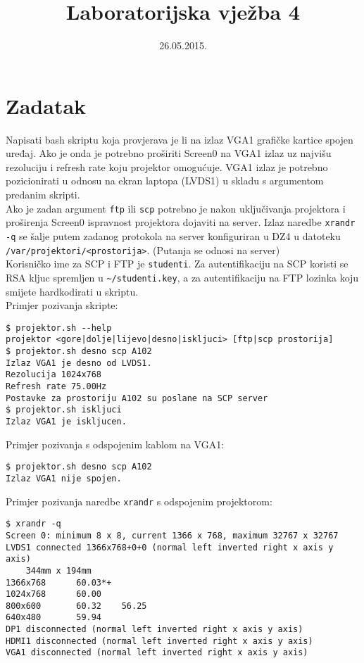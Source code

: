 \documentclass[12pt,a4paper]{article}
\begin{document}
	\title{Laboratorijska vježba 4}
	\date{\vspace{-5ex} 26.05.2015.}
	\maketitle

\section*{Zadatak}

Napisati bash skriptu koja provjerava je li na izlaz VGA1 grafičke kartice spojen uređaj. Ako je onda je potrebno proširiti Screen0 na VGA1 izlaz uz najvišu rezoluciju i refresh rate koju projektor omogućuje. VGA1 izlaz je potrebno pozicionirati u odnosu na ekran laptopa (LVDS1) u skladu s argumentom predanim skripti.\\

Ako je zadan argument \texttt{ftp} ili \texttt{scp} potrebno je nakon uključivanja projektora i proširenja Screen0 ispravnost projektora dojaviti na server. Izlaz naredbe \texttt{xrandr -q} se šalje putem zadanog protokola na server konfiguriran u DZ4 u datoteku \texttt{/var/projektori/<prostorija>}. (Putanja se odnosi na server)\\

Korisničko ime za SCP i FTP je \texttt{studenti}. Za autentifikaciju na SCP koristi se RSA kljuc spremljen u \texttt{\textasciitilde/studenti.key}, a za autentifikaciju na FTP lozinka koju smijete hardkodirati u skriptu.\\

Primjer pozivanja skripte:
	\begin{verbatim}
$ projektor.sh --help
projektor <gore|dolje|lijevo|desno|iskljuci> [ftp|scp prostorija]
$ projektor.sh desno scp A102
Izlaz VGA1 je desno od LVDS1.
Rezolucija 1024x768
Refresh rate 75.00Hz
Postavke za prostoriju A102 su poslane na SCP server
$ projektor.sh iskljuci
Izlaz VGA1 je iskljucen.
	\end{verbatim}

Primjer pozivanja s odspojenim kablom na VGA1:
	\begin{verbatim}
$ projektor.sh desno scp A102
Izlaz VGA1 nije spojen.
	\end{verbatim}


\vspace{1em}

Primjer pozivanja naredbe \texttt{xrandr} s odspojenim projektorom:
	\begin{verbatim}
$ xrandr -q
Screen 0: minimum 8 x 8, current 1366 x 768, maximum 32767 x 32767
LVDS1 connected 1366x768+0+0 (normal left inverted right x axis y axis)
    344mm x 194mm
1366x768      60.03*+
1024x768      60.00  
800x600       60.32    56.25  
640x480       59.94  
DP1 disconnected (normal left inverted right x axis y axis)
HDMI1 disconnected (normal left inverted right x axis y axis)
VGA1 disconnected (normal left inverted right x axis y axis)
	\end{verbatim}
\end{document}
